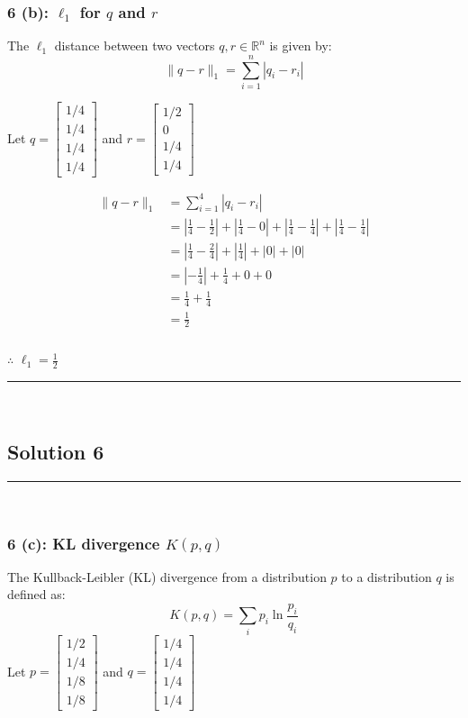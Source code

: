 \documentclass{article}
\begin{document}
\subsubsection*{6 (b): $\ell_1$ for $q$ and $r$}
\parbox{\textwidth}{The $\ell_1$ distance between two vectors $q, r \in \mathbb{R}^n$ is given by:
$$\|q-r\|_1 = \sum_{i=1}^n |q_i - r_i|$$

Let $q = \begin{bmatrix} 1/4 \\ 1/4 \\ 1/4 \\ 1/4 \end{bmatrix}$ and $r = \begin{bmatrix} 1/2 \\ 0 \\ 1/4 \\ 1/4 \end{bmatrix}$

\begin{align*}
\|q-r\|_1 &= \sum_{i=1}^{4} |q_i - r_i| \\
&= \left|\frac{1}{4} - \frac{1}{2}\right| + \left|\frac{1}{4} - 0\right| + \left|\frac{1}{4} - \frac{1}{4}\right| + \left|\frac{1}{4} - \frac{1}{4}\right| \\
&= \left|\frac{1}{4} - \frac{2}{4}\right| + \left|\frac{1}{4}\right| + |0| + |0| \\
&= \left|-\frac{1}{4}\right| + \frac{1}{4} + 0 + 0 \\
&= \frac{1}{4} + \frac{1}{4} \\
&= \frac{1}{2}
\end{align*}
}

\subsubsection*{\normalfont}{$\therefore$ $\ell_1 = \frac{1}{2}$}

\noindent\rule{\textwidth}{0.4pt}\\

\newpage

\subsection*{Solution 6}
\noindent\rule{\textwidth}{0.4pt}\\

\subsubsection*{6 (c): KL divergence $K(p, q)$}
\parbox{\textwidth}{
The Kullback-Leibler (KL) divergence from a distribution $p$ to a distribution $q$ is defined as:
$$K(p, q) = \sum_{i} p_i \ln \frac{p_i}{q_i}$$
Let $p = \begin{bmatrix} 1/2 \\ 1/4 \\ 1/8 \\ 1/8 \end{bmatrix}$ and $q = \begin{bmatrix} 1/4 \\ 1/4 \\ 1/4 \\ 1/4 \end{bmatrix}$
}
\end{document}

